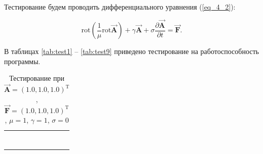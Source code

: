Тестирование будем проводить дифференциального уравнения (\ref{eq_4_2}):

\begin{equation} \label{eq_4_2}
	\text{rot} \left(\frac{1}{\mu} \text{rot} \overrightarrow{\textbf{A}}\right) + \gamma \overrightarrow{\textbf{A}} + \sigma \frac{\partial \overrightarrow{\textbf{A}}}{\partial t} = \overrightarrow{\textbf{F}}.
\end{equation}

В таблицах \ref{tab:test1} -- \ref{tab:test9} приведено тестирование на работоспособность программы.

\begin{table}
	\caption{Тестирование при $\overrightarrow{\textbf{A}} = (1.0, 1.0, 1.0)^{\text{T}}$, $\overrightarrow{\textbf{F}} = (1.0, 1.0, 1.0)^{\text{T}}$, $\mu = 1$, $\gamma = 1$, $\sigma = 0$}
	\centering
	\small
	\begin{tabularx}{1.0\textwidth}{| >{\raggedright\arraybackslash}X | >{\raggedright\arraybackslash}X | >{\raggedright\arraybackslash}X |>{\raggedright\arraybackslash}X |}
		\hline
		\centering{Ребро} & \centering{Значение} & \centering{Абсолютная погрешность} & \centering{Относительная погрешность} \tabularnewline \hline
		
		
		\centering{($x; 1.0; 1.0$)} & \centering{1.00000000E+000}& \centering{0.00000000E+000} & \centering{0.00000000E+000} \tabularnewline \hline
		
		\centering{($x; 2.0; 1.0$)} & \centering{1.00000000E+000}& \centering{0.00000000E+000} & \centering{0.00000000E+000} \tabularnewline \hline
		
		\centering{($x; 1.0; 2.0$)} & \centering{1.00000000E+000}& \centering{0.00000000E+000} & \centering{0.00000000E+000} \tabularnewline \hline
		
		\centering{($x; 2.0; 2.0$)} & \centering{1.00000000E+000}& \centering{0.00000000E+000} & \centering{0.00000000E+000} \tabularnewline \hline
		
		
		
		\centering{($1.0; y; 1.0$)} & \centering{1.00000000E+000}& \centering{0.00000000E+000} & \centering{0.00000000E+000} \tabularnewline \hline
		
		\centering{($2.0; y; 1.0$)} & \centering{1.00000000E+000}& \centering{0.00000000E+000} & \centering{0.00000000E+000} \tabularnewline \hline
		
		\centering{($1.0; y; 2.0$)} & \centering{1.00000000E+000}& \centering{0.00000000E+000} & \centering{0.00000000E+000} \tabularnewline \hline
		

\end{tabularx}
\end{table}
